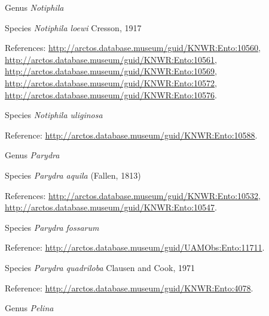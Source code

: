 \documentclass[9pt, article]{memoir}
\begin{document}
\begin{multicols}{2}
\vspace{6pt}\noindent\hspace{30pt}Genus \textit{Notiphila}


\vspace{6pt}\noindent\hspace{36pt}Species \textit{Notiphila loewi} Cresson, 1917


\vspace{6pt}References: 
\url{http://arctos.database.museum/guid/KNWR:Ento:10560}, 
\url{http://arctos.database.museum/guid/KNWR:Ento:10561}, 
\url{http://arctos.database.museum/guid/KNWR:Ento:10569}, 
\url{http://arctos.database.museum/guid/KNWR:Ento:10572}, 
\url{http://arctos.database.museum/guid/KNWR:Ento:10576}.

\vspace{6pt}\noindent\hspace{36pt}Species \textit{Notiphila uliginosa}


\vspace{6pt}Reference: 
\url{http://arctos.database.museum/guid/KNWR:Ento:10588}.

\vspace{6pt}\noindent\hspace{30pt}Genus \textit{Parydra}


\vspace{6pt}\noindent\hspace{36pt}Species \textit{Parydra aquila} (Fallen, 1813)


\vspace{6pt}References: 
\url{http://arctos.database.museum/guid/KNWR:Ento:10532}, 
\url{http://arctos.database.museum/guid/KNWR:Ento:10547}.

\vspace{6pt}\noindent\hspace{36pt}Species \textit{Parydra fossarum}


\vspace{6pt}Reference: 
\url{http://arctos.database.museum/guid/UAMObs:Ento:11711}.

\vspace{6pt}\noindent\hspace{36pt}Species \textit{Parydra quadriloba} Clausen and Cook, 1971


\vspace{6pt}Reference: 
\url{http://arctos.database.museum/guid/KNWR:Ento:4078}.

\vspace{6pt}\noindent\hspace{30pt}Genus \textit{Pelina}



\end{multicols}
\end{document}
